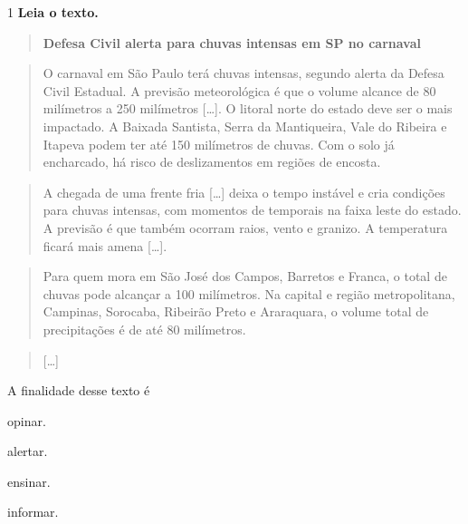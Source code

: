 \num{1} \textbf{Leia o texto.}

\begin{quote}
\textbf{Defesa Civil alerta para chuvas intensas em SP no carnaval}
\end{quote}

\begin{quote}
O carnaval em São Paulo terá chuvas intensas, segundo alerta da Defesa
Civil Estadual. A previsão meteorológica é que o volume alcance de 80
milímetros a 250 milímetros {[}\ldots{]}. O litoral norte do estado deve
ser o mais impactado. A Baixada Santista, Serra da Mantiqueira, Vale do
Ribeira e Itapeva podem ter até 150 milímetros de chuvas. Com o solo já
encharcado, há risco de deslizamentos em regiões de encosta.
\end{quote}

\begin{quote}
A chegada de uma frente fria {[}\ldots{]} deixa o tempo instável e cria
condições para chuvas intensas, com momentos de temporais na faixa leste
do estado. A previsão é que também ocorram raios, vento e granizo. A
temperatura ficará mais amena {[}\ldots{]}.
\end{quote}

\begin{quote}
Para quem mora em São José dos Campos, Barretos e Franca, o total de
chuvas pode alcançar a 100 milímetros. Na capital e região
metropolitana, Campinas, Sorocaba, Ribeirão Preto e Araraquara, o volume
total de precipitações é de até 80 milímetros.
\end{quote}

\begin{quote}
{[}\ldots{]}
\end{quote}


A finalidade desse texto é

\begin{escolha}

\item opinar.

\item alertar.

\item ensinar.

\item informar.
\end{escolha}

